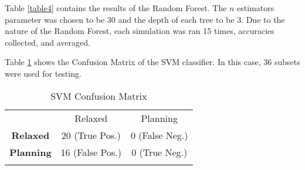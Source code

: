\documentclass[conference,compsoc]{IEEEtran}
\begin{document}
Table \ref{table4} contains the results of the Random Forest. The $n$ estimators parameter was chosen to be $30$ and the depth of each tree to be $3$. Due to the nature of the Random Forest, each simulation was ran 15 times, accuracies collected, and averaged.
\begin{table*}
	\caption{Accuracies for Random Forest Classifier}
	\label{table4}
	\noindent{}

\end{table*}

Table \ref{table5} shows the Confusion Matrix of the SVM classifier. In this case, $36$ subsets were used for testing.
\begin{table}
\centering
\caption{SVM Confusion Matrix}
\label{table5}
\begin{tabularx}{.7\textwidth}{>{\bfseries} c | c c | }
& Relaxed & \multicolumn{1}{c}{Planning}\\
\hhline{---}
Relaxed & 20 (True Pos.) \cellcolor[gray]{.8}& 0 (False Neg.) \\ 
Planning & 16 (False Pos.) & 0 (True Neg.) \cellcolor[gray]{.8} \\
\hhline{~--}
\end{tabularx}

\end{table}
\end{document}
